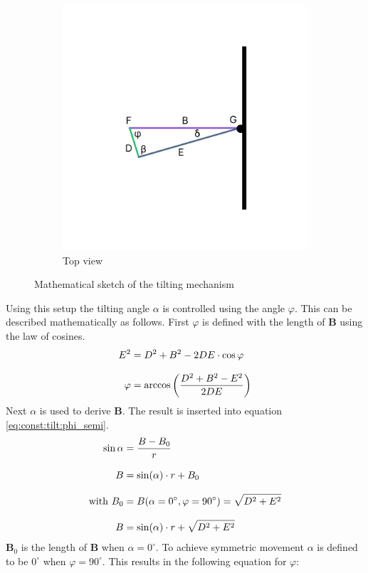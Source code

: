 \begin{figure}
\begin{subfigure}[b]{0.49\textwidth}
    \includegraphics[width=\textwidth]{src/assets/pictures/construction/math_top.png}
    \caption{Top view}
    \label{fig:const:tilt:math_top}
  \end{subfigure}
  \caption{Mathematical sketch of the tilting mechanism}
  \label{fig:const:tilt:math}
\end{figure}
\p
Using this setup the tilting angle $\alpha$ is controlled using the angle $\varphi$. This can be described mathematically as follows. First $\varphi$ is defined with the length of \textbf{B} using the law of cosines.
%
\begin{align}
  E^2     &= D^2 + B^2 - 2DE \cdot \cos \varphi \pmath
  \varphi &= \arccos \left( \frac{D^2 + B^2 - E^2}{2DE} \right) \label{eq:const:tilt:phi_semi}
\end{align}
%
Next $\alpha$ is used to derive \textbf{B}. The result is inserted into equation \ref{eq:const:tilt:phi_semi}.
%
\begin{align}
  \sin \alpha &= \frac{B - B_0}{r}\pmath
  B           &= \sin (\alpha) \cdot r + B_0\pmath
  \mathrm{with~} B_0 &= B(\alpha = 0^\circ, \varphi = 90^\circ) = \sqrt{D^2 + E^2}\pmath
  B           &= \sin (\alpha) \cdot r + \sqrt{D^2 + E^2}
\end{align}
%
\textbf{B$_0$} is the length of \textbf{B} when $\alpha = 0^\circ$. To achieve symmetric movement $\alpha$ is defined to be $0^\circ$ when $\varphi = 90^\circ$. This results in the following equation for $\varphi$:
